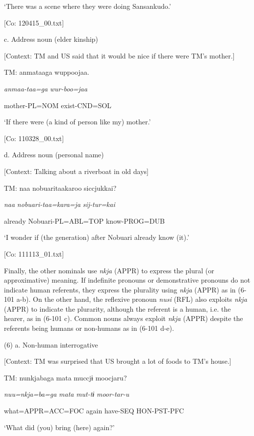       ‘There was a scene where they were doing Sansankudo.’

      [Co: 120415\_00.txt]

  c.  Address noun (elder kinship)

    [Context: TM and US said that it would be nice if there were TM’s mother.]

    TM:  anmataaga  wuppoojaa.

      \textit{anmaa-taa=ga}  \textit{wur-boo=jaa}

      mother-PL=NOM  exist-CND=SOL

      ‘If there were (a kind of person like my) mother.’

      [Co: 110328\_00.txt]

  d.  Address noun (personal name)

    [Context: Talking about a riverboat in old days]

    TM:  naa  nobuaritaakaroo  siccjukkai?

      \textit{naa}  \textit{nobuari-taa=kara=ja}  \textit{sij-tur=kai}

      already  Nobuari-PL=ABL=TOP  know-PROG=DUB

      ‘I wonder if (the generation) after Nobuari already know (it).’

      [Co: 111113\_01.txt]

  Finally, the other nominals use \textit{nkja} (APPR) to express the plural (or approximative) meaning. If indefinite pronouns or demonstrative pronouns do not indicate human referents, they express the plurality using \textit{nkja} (APPR) as in (6-101 a-b). On the other hand, the reflexive pronoun \textit{nusi} (RFL) also exploits \textit{nkja} (APPR) to indicate the plurarity, although the referent is a human, i.e. the hearer, as in (6-101 c). Common nouns always exploit \textit{nkja} (APPR) despite the referents being humans or non-humans as in (6-101 d-e).

(6)  a.  Non-human interrogative

    [Context: TM was surprised that US brought a lot of foods to TM’s house.]

    TM:  nunkjabaga  mata  muccjɨ  moocjaru?

      \textit{nuu=nkja=ba=ga}  \textit{mata}  \textit{mut-tɨ}  \textit{moor-tar-u}

      what=APPR=ACC=FOC  again  have-SEQ  HON-PST-PFC

      ‘What did (you) bring (here) again?’

